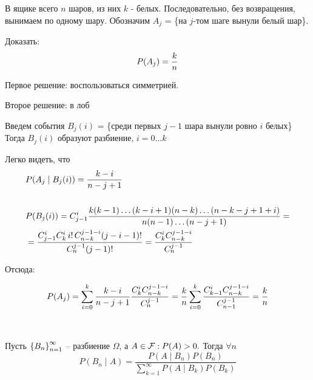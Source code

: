 \begin{example}
	В ящике всего $n$ шаров, из них $k$ - белых. Последовательно, без возвращения, вынимаем по одному шару. 
	Обозначим $A_j$ = \{на $j$-том шаге вынули белый шар\}.

	Доказать:
	\begin{equation*}
		P(A_j) = \frac{k}{n}\\
	\end{equation*}
	
	Первое решение: воспользоваться симметрией.
	
	Второе решение: в лоб

	Введем события $B_j(i)$ = \{среди первых $j - 1$ шара вынули ровно $i$  белых\}\\
	Тогда $B_j(i)$ образуют разбиение, $i = 0 \ldots k$
	
	Легко видеть, что
	\begin{align*}
		&P(A_j \mid B_j(i)) = \frac{k - i}{n - j + 1}\\\\
		&P(B_j(i)) = C_{j - 1}^{i} \frac{ k  (k - 1)  \ldots  (k - i + 1)(n - k) \ldots (n - k - j + 1 + i)}{n(n-1)\ldots (n - j + 1)} = \\
		&= \frac{C_{j - 1}^{i} C_{k}^{i}\, i!\, C_{n-k}^{j-1-i} (j - i - 1)!}{C_{n}^{j - 1} (j-1)!} = \frac{C_{k}^{i} C_{n - k}^{j - 1- i}}{C_{n}^{j - 1}}
	\end{align*}
	
	Отсюда:
	
	\begin{equation*}
		P(A_j) = \sum_{i = 0}^{k} \frac{k - i}{n - j + 1} 
			\frac{C_{k}^{i} C_{n - k}^{j - 1- i}}{C_{n}^{j - 1}} \\
		= \frac{k}{n} \sum_{i = 0}^{k} 
			\frac{C_{k - 1}^{i} C_{n - k}^{j - 1- i}}{C_{n - 1}^{j - 1}} = \frac{k}{n}\\
	\end{equation*}

\end{example}

\begin{lemma}~

	Пусть $\left\{ B_n \right\}_{n = 1}^{\infty}$ -- разбиение $\Omega$, а $A \in \mathcal{F} : P(A) > 0.$ Тогда $\forall n$
	\begin{equation*}
		P(B_n \mid A) = \frac{P(A \mid B_n) P(B_n)}{\sum_{k = 1}^{\infty} P(A \mid B_k) P(B_k)}
	\end{equation*}
\end{lemma}

